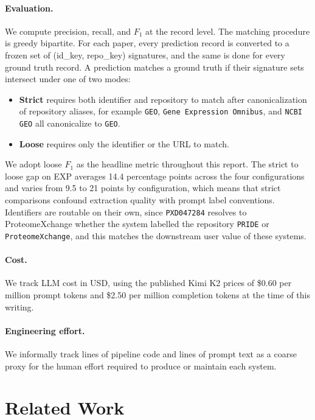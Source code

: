 \documentclass[sigconf,nonacm]{acmart}
\begin{document}
\paragraph{Evaluation.} We compute precision, recall, and $F_1$ at the record level. The matching procedure is greedy bipartite. For each paper, every prediction record is converted to a frozen set of (id\_key, repo\_key) signatures, and the same is done for every ground truth record. A prediction matches a ground truth if their signature sets intersect under one of two modes:
\begin{itemize}[leftmargin=1.2em, itemsep=0.2em]
    \item \textbf{Strict} requires both identifier and repository to match after canonicalization of repository aliases, for example \texttt{GEO}, \texttt{Gene Expression Omnibus}, and \texttt{NCBI GEO} all canonicalize to \texttt{GEO}.
    \item \textbf{Loose} requires only the identifier or the URL to match.
\end{itemize}

We adopt loose $F_1$ as the headline metric throughout this report. The strict to loose gap on EXP averages 14.4 percentage points across the four configurations and varies from 9.5 to 21 points by configuration, which means that strict comparisons confound extraction quality with prompt label conventions. Identifiers are routable on their own, since \texttt{PXD047284} resolves to ProteomeXchange whether the system labelled the repository \texttt{PRIDE} or \texttt{ProteomeXchange}, and this matches the downstream user value of these systems.

\paragraph{Cost.} We track LLM cost in USD, using the published Kimi K2 prices of \$0.60 per million prompt tokens and \$2.50 per million completion tokens at the time of this writing.

\paragraph{Engineering effort.} We informally track lines of pipeline code and lines of prompt text as a coarse proxy for the human effort required to produce or maintain each system.

\section{Related Work}
\label{sec:related}
\end{document}
